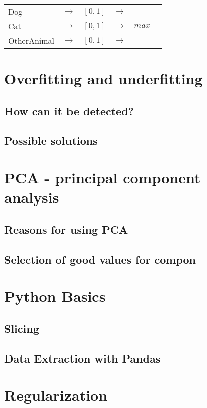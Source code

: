 \begin{tabular}{l l l l l l}
    Dog         & $\rightarrow$ & $[0, 1]$ & $\longrightarrow$ &       \\
    Cat         & $\rightarrow$ & $[0, 1]$ & $\longrightarrow$ & $max$ \\
    OtherAnimal & $\rightarrow$ & $[0, 1]$ & $\longrightarrow$ &       \\
\end{tabular}

\section{Overfitting and underfitting}

\subsection{How can it be detected?}

\subsection{Possible solutions}

\section{PCA - principal component analysis}

\subsection{Reasons for using PCA}
\subsection{Selection of good values for compon}

\section{Python Basics}

\subsection{Slicing}
\subsection{Data Extraction with Pandas}

\section{Regularization}
